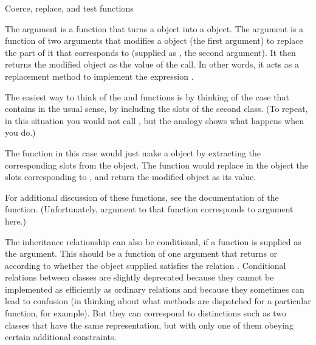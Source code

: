 \begin{Section}{Coerce, replace, and test functions}

The   argument is a function that turns a
 object into a  object.  The
 argument is a function of two arguments that modifies a 
object (the first argument) to replace the part of it that
corresponds to  (supplied as , the second
argument).  It then returns the modified object as the value of the
call.  In other words, it acts as a replacement method to
implement the expression .

The easiest way to think of the   and 
functions is by thinking of the case that  
contains  in the usual sense, by including the slots of
the second class.  (To repeat, in this situation you would not call
, but the analogy shows what happens when you do.)

The  function in this case would just make a
 object by extracting the corresponding slots from the
 object. The  function would replace in
the  object the slots corresponding to ,
and return the modified object as its value.

For additional discussion of these functions, see
the documentation of the
 function.  (Unfortunately, argument
 to that function corresponds to argument  here.)

The inheritance relationship can also be conditional, if a function is supplied as the
 argument.  This should be a function of one argument
that returns  or  according to whether the
object supplied satisfies the relation .
Conditional relations between
classes are slightly deprecated because they cannot be implemented
as efficiently as ordinary relations and because they sometimes can
lead to confusion (in thinking about what methods are dispatched for
a particular function, for example).  But they can correspond to
distinctions such as two classes that have the same representation,
but with only one of them obeying certain additional constraints.
\end{Section}
%
